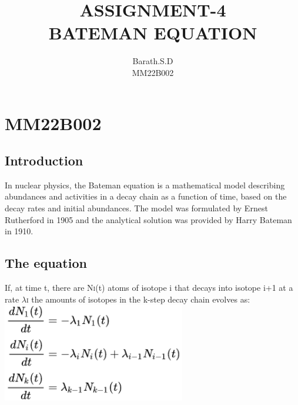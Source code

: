\documentclass{article}
\title{\textbf{ASSIGNMENT-4 \\ BATEMAN EQUATION}}
\author{Barath.S.D \\ MM22B002}
\begin{document}
\maketitle
\section{MM22B002}
\subsection{Introduction}
In nuclear physics, the Bateman equation is a mathematical model describing abundances and activities in a decay chain as a function of time, based on the decay rates and initial abundances. The model was formulated by Ernest Rutherford in 1905 and the analytical solution was provided by Harry Bateman in 1910.
\subsection{The equation}
If, at time t, there are N\textsc{i}(t) atoms of isotope i that decays into isotope i+1 at a rate $\lambda$\textsc{i} the amounts of isotopes in the k-step decay chain evolves as: 
\newline{}
\newline{}
\includegraphics[width=8cm]{image1.png}
\end{document}
